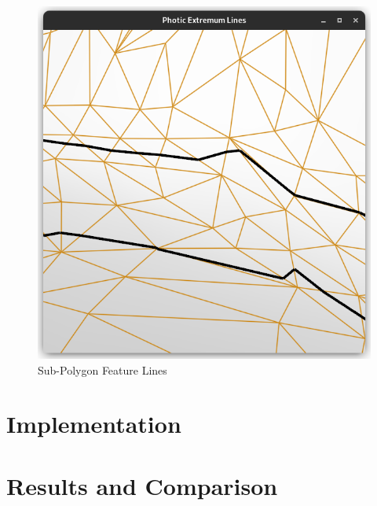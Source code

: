 \documentclass[9pt,fleqn,twoside,twocolumn]{stdglobal}
\begin{document}
  \begin{figure}
    \centering
    \includegraphics[width=\linewidth,trim={15px 15 15 50},clip]{images/subpolygon-lines.png}
    \caption{Sub-Polygon Feature Lines}
  \end{figure}

\section{Implementation}

\section{Results and Comparison}
\end{document}
